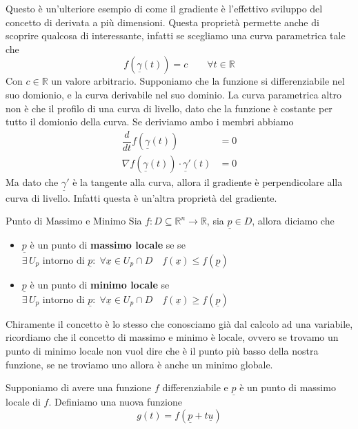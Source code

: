 \documentclass{rapport}
\begin{document}
Questo è un'ulteriore esempio di come il gradiente è l'effettivo sviluppo del concetto di derivata a più dimensioni. Questa proprietà permette anche di scoprire qualcosa di interessante, infatti se scegliamo una curva parametrica tale che 
\[
f(\underline{\gamma}(t)) = c \qquad \forall t \in \mathbb{R}
\]
Con $c\in \mathbb{R}$ un valore arbitrario. Supponiamo che la funzione si differenziabile nel suo domionio, e la curva derivabile nel suo dominio. La curva parametrica altro non è che il profilo di una curva di livello, dato che la funzione è costante per tutto il domionio della curva. Se deriviamo ambo i membri abbiamo 
\begin{align*}  
\dfrac{d}{dt} f(\underline{\gamma}(t) ) &= 0 \\
\nabla f(\underline{\gamma}(t)) \cdot \underline{\gamma}'(t) &= 0 
\end{align*}
Ma dato che $ \underline{\gamma}'$ è la tangente alla curva, allora il gradiente è perpendicolare alla curva di livello. Infatti questa è un'altra proprietà del gradiente.

\newpage
\begin{definizione}{Punto di Massimo e Minimo}{}
  Sia $f:D\subseteq\mathbb{R}^n\to \mathbb{R}$, sia $\underline{p} \in D$, allora diciamo che 
  \begin{itemize}
    \item $\underline{p}$ è un punto di \textbf{massimo locale} se se \\
      \hspace*{\fill} $\exists\, U_p \text{ intorno di } \underline{p}: \; \forall \underline{x} \in U_p \cap D \quad f(\underline{x}) \leq f(\underline{p})$ \hfill\null
    \item $\underline{p}$ è un punto di \textbf{minimo locale} se \\
    \hspace*{\fill} $\exists\, U_p \text{ intorno di } \underline{p}: \; \forall \underline{x} \in U_p \cap D \quad f(\underline{x}) \geq f(\underline{p})$ \hfill\null
  \end{itemize}
\end{definizione}

Chiramente il concetto è lo stesso che conosciamo già dal calcolo ad una variabile, ricordiamo che il concetto di massimo e minimo è locale, ovvero se trovamo un punto di minimo locale non vuol dire che è il punto più basso della nostra funzione, se ne troviamo uno allora è anche un minimo globale.

Supponiamo di avere una funzione $f$ differenziabile e $\underline{p}$ è un punto di massimo locale di $f$. Definiamo una nuova funzione 
\[
g(t) = f(\underline{p} + t\underline{u})
\]
\end{document}
